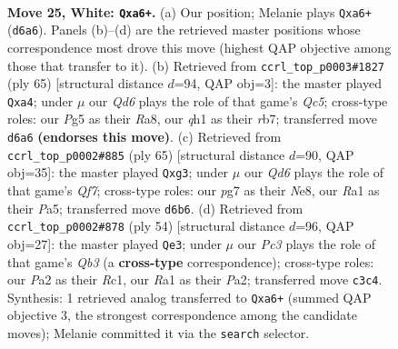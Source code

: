 \documentclass[11pt]{article}
\begin{document}
\clearpage

\begin{figure}[p]\centering
\begin{subfigure}{0.46\textwidth}\centering
\resizebox{\linewidth}{!}{%
\newchessgame
\chessboard[
  setfen={2k3nr/2r3p1/p2Q4/2p3Pp/5P1P/2P5/PP3K2/RNB4q w - - 1 25},
  showmover=false,
  pgfstyle=straightmove, color=movearrow, markmove={d6-a6}
]}
\caption{}
\end{subfigure}\hfill
\begin{subfigure}{0.46\textwidth}\centering
\resizebox{\linewidth}{!}{%
\newchessgame
\chessboard[
  setfen={r5k1/1R3pp1/4n2p/p3P3/P1q1P3/2P1Q3/1R4KP/8 b - - 0 33},
  showmover=false,
  pgfstyle=straightmove, color=movearrow, markmove={c4-a4}
]}
\caption{}
\end{subfigure}
\\[4pt]
\begin{subfigure}{0.46\textwidth}\centering
\resizebox{\linewidth}{!}{%
\newchessgame
\chessboard[
  setfen={r3n2k/1Q4p1/4p2p/pp5P/8/PP1P2R1/5qP1/1KR5 b - - 1 33},
  showmover=false,
  pgfstyle=straightmove, color=movearrow, markmove={f2-g3}
]}
\caption{}
\end{subfigure}\hfill
\begin{subfigure}{0.46\textwidth}\centering
\resizebox{\linewidth}{!}{%
\newchessgame
\chessboard[
  setfen={3r1r1k/5pp1/pp5p/5q2/4R2P/1Q6/PP3PP1/2R3K1 w - - 0 28},
  showmover=false,
  pgfstyle=straightmove, color=movearrow, markmove={b3-e3}
]}
\caption{}
\end{subfigure}
\caption{\textbf{Move 25, White: \texttt{Qxa6+}.} (a) Our position; Melanie plays \texttt{Qxa6+} (\texttt{d6a6}). Panels (b)--(d) are the retrieved master positions whose correspondence most drove this move (highest QAP objective among those that transfer to it). (b) Retrieved from \texttt{ccrl\_top\_p0003\#1827} (ply 65) [structural distance $d$=94, QAP obj=3]: the master played \texttt{Qxa4}; under $\mu$ our \emph{Qd6} plays the role of that game's \emph{Qc5}; cross-type roles: our \emph{P}g5 as their \emph{R}a8, our \emph{q}h1 as their \emph{r}b7; transferred move \texttt{d6a6} \textbf{(endorses this move)}. (c) Retrieved from \texttt{ccrl\_top\_p0002\#885} (ply 65) [structural distance $d$=90, QAP obj=35]: the master played \texttt{Qxg3}; under $\mu$ our \emph{Qd6} plays the role of that game's \emph{Qf7}; cross-type roles: our \emph{p}g7 as their \emph{N}e8, our \emph{R}a1 as their \emph{P}a5; transferred move \texttt{d6b6}. (d) Retrieved from \texttt{ccrl\_top\_p0002\#878} (ply 54) [structural distance $d$=96, QAP obj=27]: the master played \texttt{Qe3}; under $\mu$ our \emph{Pc3} plays the role of that game's \emph{Qb3} (a \textbf{cross-type} correspondence); cross-type roles: our \emph{P}a2 as their \emph{R}c1, our \emph{R}a1 as their \emph{P}a2; transferred move \texttt{c3c4}. Synthesis: 1 retrieved analog transferred to \texttt{Qxa6+} (summed QAP objective 3, the strongest correspondence among the candidate moves); Melanie committed it via the \texttt{search} selector.}
\label{fig:thought-m48}
\end{figure}
\end{document}
